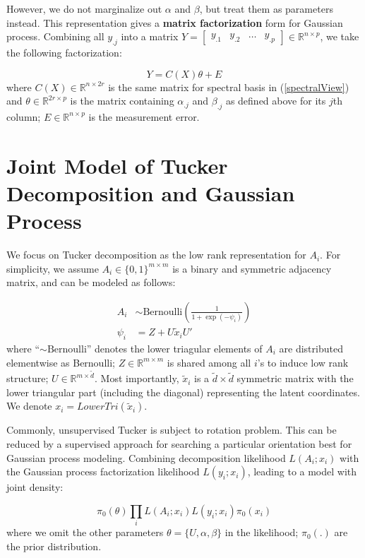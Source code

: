 \documentclass[11pt]{article}
\begin{document}
However, we do not marginalize out $\alpha$ and $\beta$, but treat them as parameters instead. This representation gives a {\bf matrix factorization} form for Gaussian process. Combining all $y_{.j}$ into a matrix $Y=\begin{bmatrix}y_{.1}  & y_{.2} & \ldots & y_{.p} \end{bmatrix} \in \mathbb{R}^{n\times p}$, we take the following factorization:

$$Y= C(X)\theta + E $$
where $C(X) \in \mathbb{R}^{n\times 2r}$ is the same matrix for spectral basis in (\ref{spectralView})  and $\theta \in\mathbb{R}^{2r \times p}$ is the matrix containing $\alpha_{.j}$ and $\beta_{.j}$ as defined above for its $j$th column; $E\in \mathbb{R}^{n\times p}$ is the measurement error.

\section{Joint Model of Tucker Decomposition and Gaussian Process}

We focus on Tucker decomposition as the low rank representation for $A_i$. For simplicity, we assume $A_i\in\{0,1\}^{m\times m}$ is a binary and symmetric adjacency matrix, and can be modeled as follows:


\begin{equation}
\begin{aligned}
A_i &\sim \mbox{Bernoulli}( \frac{1}{1+\exp(-\psi_i)})\\
\psi_i & = Z +  U \tilde{x}_i U'
\end{aligned}
\end{equation}
where ``$\sim \mbox{Bernoulli}$'' denotes the lower triagular elements of $A_i$ are distributed elementwise as Bernoulli; $Z\in\mathbb{R}^{m\times m}$ is shared among all $i$'s to induce low rank structure; $U\in \mathbb{R}^{m \times \tilde d}$. Most importantly, $\tilde x_i$ is a $\tilde d \times \tilde d$ symmetric matrix with the lower triangular part (including the diagonal) representing the latent coordinates. We denote $x_i = LowerTri(\tilde x_i)$.

Commonly, unsupervised Tucker is subject to rotation problem. This can be reduced by a supervised approach for searching a particular orientation best for Gaussian process modeling. Combining decomposition likelihood $L(A_i; x_i)$ with the Gaussian process factorization likelihood $L(y_i; x_i)$, leading to a model with joint density:

$$\pi_0(\theta)\prod_i L(A_i ; x_i) L(y_i; x_i) \pi_0(x_i)$$
where we omit the other parameters $\theta = \{U, \alpha, \beta\}$ in the likelihood; $\pi_0(.)$ are the prior distribution.
\end{document}
